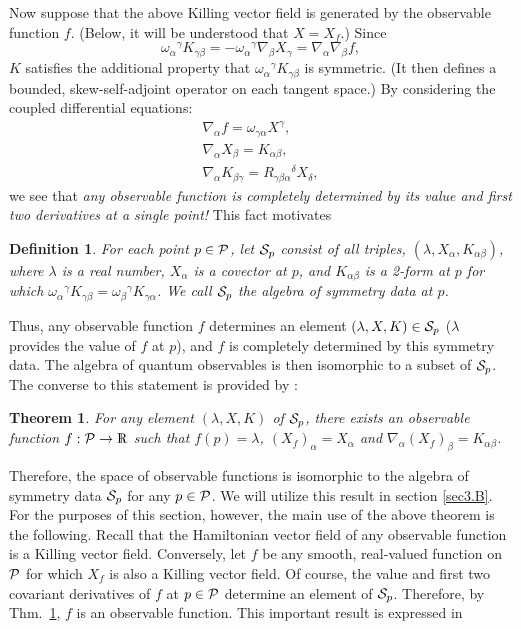 \documentclass[12pt,aps,eqsecnum,tighten]{revtex4-2}
\newtheorem{theorem}{Theorem}[section]
\newtheorem{definition}{Definition}[section]
\def\be{\begin{equation}}
\def\ee{\end{equation}}
\def\ba{\begin{eqnarray}}
\def\ea{\end{eqnarray}}
\def\a{\alpha}
\def\b{\beta}
\def\c{\gamma}
\def\de{\delta}
\def\grad{\nabla}
\def\P{{\cal P}}
\def\w{\omega}
\newcommand{\hvf}[1]{{X_{#1}}}
\def\Rl{{\mathchoice 
{\setbox0=\hbox{$\displaystyle\rm R$}\hbox{\hbox to0pt
{\kern0.4\wd0\vrule height0.9\ht0\hss}\box0}}
{\setbox0=\hbox{$\textstyle\rm R$}\hbox{\hbox to0pt
{\kern0.4\wd0\vrule height0.9\ht0\hss}\box0}}
{\setbox0=\hbox{$\scriptstyle\rm R$}\hbox{\hbox to0pt
{\kern0.4\wd0\vrule height0.9\ht0\hss}\box0}}
{\setbox0=\hbox{$\scriptscriptstyle\rm R$}\hbox{\hbox to0pt
{\kern0.4\wd0\vrule height0.9\ht0\hss}\box0}}}}
\def\Rl{{\mathchoice
{\setbox0=\hbox{$\displaystyle\rm R$}\hbox{\hbox to0pt
{\kern0.4\wd0\vrule height0.9\ht0\hss}\box0}}
{\setbox0=\hbox{$\textstyle\rm R$}\hbox{\hbox to0pt
{\kern0.4\wd0\vrule height0.9\ht0\hss}\box0}}
{\setbox0=\hbox{$\scriptstyle\rm R$}\hbox{\hbox to0pt
{\kern0.4\wd0\vrule height0.9\ht0\hss}\box0}}
{\setbox0=\hbox{$\scriptscriptstyle\rm R$}\hbox{\hbox to0pt
{\kern0.4\wd0\vrule height0.9\ht0\hss}\box0}}}}
\def\R{\Rl}
\begin{document}
Now suppose that the above Killing vector field is generated by the
observable function $f$. (Below, it will be understood that $X =
\hvf{f}$.) Since
%
\be
\w_\a{}^\c K_{\c\b} = - \w_\a{}^\c \grad_\b X_\c
		    = \grad_\a \grad_\b f,
\ee
%
$K$ satisfies the additional property that $\w_\a{}^\c K_{\c\b}$ is
symmetric.  (It then defines a bounded, skew-self-adjoint operator on
each tangent space.)  By considering the coupled differential
equations: 
%
\ba \grad_\a f = \w_{\c\a} X^\c, \\ \grad_\a X_\b =
K_{\a\b}, \\ \grad_\a K_{\b\c} = R_{\c\b\a}{}^\de X_\de, \ea 
%
we see \cite{thesis} that {\em any observable function is completely
determined by its value and first two derivatives at a single point!}
This fact motivates
%
\begin{definition}\label{Sp}
For each point $p\in\P$, let ${\cal S}_p$ consist of all triples,
$(\lambda, X_\a, K_{\a\b})$, where $\lambda$ is a real number, $X_\a$
is a covector at $p$, and $K_{\a\b}$ is a 2-form at $p$ for which
 $\w_\a{}^\c K_{\c\b} = \w_\b{}^\c K_{\c\a}$.  We call ${\cal S}_p$
the {\em algebra of symmetry data at $p$}.
\end{definition}
%
\noindent Thus, any observable function $f$ determines an element
$(\lambda, X, K) \in {\cal S}_p$ ($\lambda$ provides the value of $f$
at $p$), and $f$ is completely determined by this symmetry data.  The
algebra of quantum observables is then isomorphic to a subset of
${\cal S}_p$.  The converse to this statement is provided by
\cite{thesis}:
%
\begin{theorem}\label{thm_data}
For any element $(\lambda, X, K)$ of ${\cal S}_p$, there exists an
observable function $f : \P \rightarrow \R$ such that
$f(p) = \lambda$,  $(\hvf{f})_\a = X_\a$
and $\grad_\a (\hvf{f})_\b = K_{\a\b}$.
\end{theorem}
%
Therefore, the space of observable functions is isomorphic to the
algebra of symmetry data ${\cal S}_p$ for any $p\in\P$.  We will
utilize this result in section \ref{sec3.B}.  For the purposes of this
section, however, the main use of the above theorem is the following.
Recall that the Hamiltonian vector field of any observable function is
a Killing vector field.  Conversely, let $f$ be any smooth,
real-valued function on $\P$ for which $\hvf{f}$ is also a Killing
vector field.  Of course, the value and first two covariant
derivatives of $f$ at $p\in\P$ determine an element of ${\cal S}_p$.
Therefore, by Thm.~\ref{thm_data}, $f$ is an observable function.
This important result is expressed in
\end{document}
